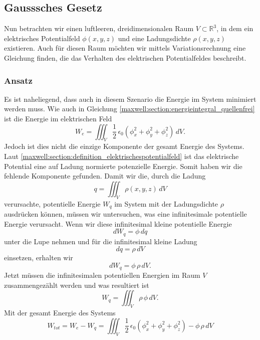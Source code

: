 %
%
%
%
\subsection{Gausssches Gesetz
\label{maxwell:section:elektrostatik_mit_quelle}}
Nun betrachten wir einen luftleeren, dreidimensionalen Raum $V\subset\mathbb{R}^3$, in dem ein elektrisches Potentialfeld $\phi(x,y,z)$ und eine Ladungsdichte $\rho(x,y,z)$ existieren.
Auch für diesen Raum möchten wir mittels Variationsrechnung eine Gleichung finden, die das Verhalten des elektrischen Potentialfeldes beschreibt.

\subsubsection{Ansatz}
Es ist naheliegend, dass auch in diesem Szenario die Energie im System minimiert werden muss.
Wie auch in Gleichung \eqref{maxwell:section:energieintegral_quellenfrei} ist die Energie im elektrischen Feld
\[
W_e
=
\iiint_V \frac{1}{2}\,\epsilon_0\left(\phi_x^2 + \phi_y^2 + \phi_z^2\right)\, dV.
\]
Jedoch ist dies nicht die einzige Komponente der gesamt Energie des Systems.
Laut \ref{maxwell:section:definition_elektrischespotentialfeld} ist das elektrische Potential eine auf Ladung normierte potenzielle Energie.
Somit haben wir die fehlende Komponente gefunden.
Damit wir die, durch die Ladung
\begin{equation}
q
=
\iiint_V \rho(x,y,z)\, dV
\label{maxwell:ladung}
\end{equation}
verursachte, potentielle Energie $W_q$ im System mit der Ladungsdichte $\rho$ ausdrücken können, müssen wir untersuchen, was eine infinitesimale potentielle Energie verursacht.
Wenn wir diese infinitesimal kleine potentielle Energie
\[
dW_q
=
\phi\, dq
\]
unter die Lupe nehmen und für die infinitesimal kleine Ladung
\[
dq
=
\rho\, dV
\]
einsetzen, erhalten wir
\[
dW_q
=
\phi\,\rho\, dV.
\]
Jetzt müssen die infinitesimalen potentiellen Energien im Raum $V$ zusammengezählt werden und was resultiert ist
\begin{equation}
W_q
=
\iiint_V \rho\,\phi\, dV.
\label{maxwell:section:potenzielle_energie_ladung}
\end{equation}
Mit der gesamt Energie des Systems
\[
W_{tot}
=
W_e - W_q
=
\iiint_V \frac{1}{2}\,\epsilon_0\left(\phi_x^2 + \phi_y^2 + \phi_z^2\right) - \phi\,\rho\, dV
\]
